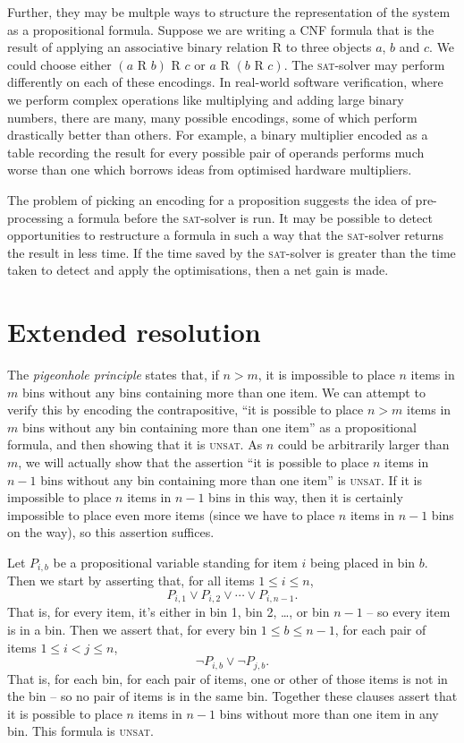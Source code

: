 \documentclass[11pt]{article}
\begin{document}
Further, they may be multple ways to structure the representation of the system as a propositional formula. Suppose we are writing a CNF formula that is the result of applying an associative binary relation R to three objects $a$, $b$ and $c$. We could choose either $(a\mbox{ R }b)\mbox{ R }c$ or $a\mbox{ R }(b\mbox{ R }c)$. The \textsc{sat}-solver may perform differently on each of these encodings. In real-world software verification, where we perform complex operations like multiplying and adding large binary numbers, there are many, many possible encodings, some of which perform drastically better than others. For example, a binary multiplier encoded as a table recording the result for every possible pair of operands performs much worse than one which borrows ideas from optimised hardware multipliers.

The problem of picking an encoding for a proposition suggests the idea of pre-processing a formula before the \textsc{sat}-solver is run. It may be possible to detect opportunities to restructure a formula in such a way that the \textsc{sat}-solver returns the result in less time. If the time saved by the \textsc{sat}-solver is greater than the time taken to detect and apply the optimisations, then a net gain is made.

\section{Extended resolution}

The \emph{pigeonhole principle} states that, if $n > m$, it is impossible to place $n$ items in $m$ bins without any bins containing more than one item. We can attempt to verify this by encoding the contrapositive, ``it is possible to place $n>m$ items in $m$ bins without any bin containing more than one item'' as a propositional formula, and then showing that it is \textsc{unsat}. As $n$ could be arbitrarily larger than $m$, we will actually show that the assertion ``it is possible to place $n$ items in $n-1$ bins without any bin containing more than one item'' is \textsc{unsat}. If it is impossible to place $n$ items in $n-1$ bins in this way, then it is certainly impossible to place even more items (since we have to place $n$ items in $n-1$ bins on the way), so this assertion suffices.

Let $P_{i,b}$ be a propositional variable standing for item $i$ being placed in bin $b$. Then we start by asserting that, for all items $1 \leq i \leq n$,
$$P_{i,1} \vee P_{i,2} \vee \cdots \vee P_{i,n-1}.$$
That is, for every item, it's either in bin 1, bin 2, \dots, or bin $n-1$ -- so every item is in a bin. Then we assert that, for every bin $1 \leq b \leq n-1$, for each pair of items $1 \leq i < j \leq n$,
$$\neg P_{i,b} \vee \neg P_{j,b}.$$
That is, for each bin, for each pair of items, one or other of those items is not in the bin -- so no pair of items is in the same bin. Together these clauses assert that it is possible to place $n$ items in $n-1$ bins without more than one item in any bin. This formula is \textsc{unsat}.
\end{document}
